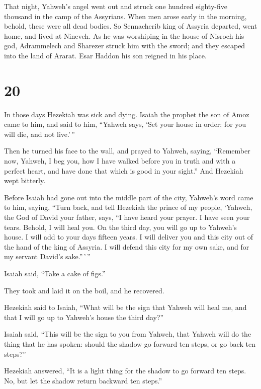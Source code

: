  That night, Yahweh's angel went out and struck one hundred
eighty-five thousand in the camp of the Assyrians. When men arose early
in the morning, behold, these were all dead bodies.  So
Sennacherib king of Assyria departed, went home, and lived at Nineveh.
 As he was worshiping in the house of Nisroch his god,
Adrammelech and Sharezer struck him with the sword; and they escaped
into the land of Ararat. Esar Haddon his son reigned in his place.

\hypertarget{section-19}{%
\section{20}\label{section-19}}

 In those days Hezekiah was sick and dying. Isaiah the
prophet the son of Amoz came to him, and said to him, ``Yahweh says,
`Set your house in order; for you will die, and not live.'\,''

 Then he turned his face to the wall, and prayed to Yahweh,
saying,  ``Remember now, Yahweh, I beg you, how I have
walked before you in truth and with a perfect heart, and have done that
which is good in your sight.'' And Hezekiah wept bitterly.

 Before Isaiah had gone out into the middle part of the
city, Yahweh's word came to him, saying,  ``Turn back, and
tell Hezekiah the prince of my people, `Yahweh, the God of David your
father, says, ``I have heard your prayer. I have seen your tears.
Behold, I will heal you. On the third day, you will go up to Yahweh's
house.  I will add to your days fifteen years. I will
deliver you and this city out of the hand of the king of Assyria. I will
defend this city for my own sake, and for my servant David's
sake.''\,'\,''

 Isaiah said, ``Take a cake of figs.''

They took and laid it on the boil, and he recovered.

 Hezekiah said to Isaiah, ``What will be the sign that
Yahweh will heal me, and that I will go up to Yahweh's house the third
day?''

 Isaiah said, ``This will be the sign to you from Yahweh,
that Yahweh will do the thing that he has spoken: should the shadow go
forward ten steps, or go back ten steps?''

 Hezekiah answered, ``It is a light thing for the shadow to
go forward ten steps. No, but let the shadow return backward ten
steps.''

